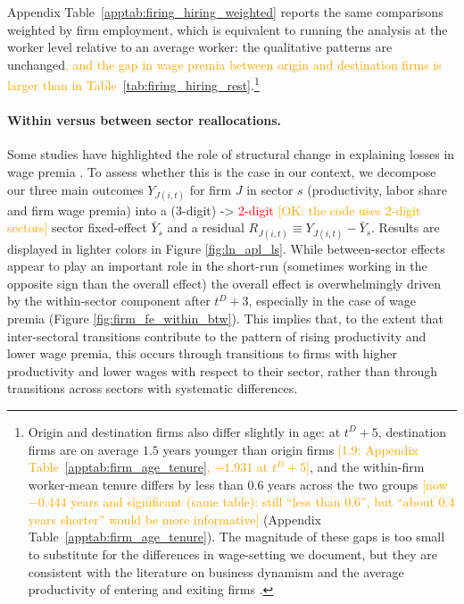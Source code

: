 Appendix Table~\ref{apptab:firing_hiring_weighted} reports the same comparisons weighted by firm employment, which is equivalent to running the analysis at the worker level relative to an average worker: the qualitative patterns are unchanged\textcolor{orange}{, and the gap in wage premia between origin and destination firms is larger than in Table~\ref{tab:firing_hiring_rest}}.\footnote{Origin and destination firms also differ slightly in age: at $t^D+5$, destination firms are on average $1.5$ years younger than origin firms \textcolor{orange}{[1.9: Appendix Table~\ref{apptab:firm_age_tenure}, $-1.931$ at $t^D+5$]}, and the within-firm worker-mean tenure differs by less than $0.6$ years across the two groups \textcolor{orange}{[now $-0.444$ years and significant (same table): still ``less than 0.6'', but ``about 0.4 years shorter'' would be more informative]} (Appendix Table~\ref{apptab:firm_age_tenure}). The magnitude of these gaps is too small to substitute for the differences in wage-setting we document, but they are consistent with the literature on business dynamism and the average productivity of entering and exiting firms \citep{foster2008reallocation,haltiwanger2018cyclical}.}




\paragraph{Within versus between sector reallocations.} Some studies have highlighted the role of structural change in explaining losses in wage premia \citep{helm2022}. To assess whether this is the case in our context, %
we decompose our three main outcomes $Y_{J(i,t)}$ for firm $J$ in sector $s$ %
(productivity, labor share and firm wage premia) into a (3-digit) -> \textcolor{red}{2-digit} \textcolor{orange}{[OK: the code uses 2-digit sectors]} sector fixed-effect $\bar{Y}_s$ and a residual $R_{J(i,t)} \equiv Y_{J(i,t)}-\bar{Y}_s$. Results are displayed in lighter colors in Figure \ref{fig:ln_apl_ls}. While between-sector effects appear to play an important role in the short-run (sometimes working in the opposite sign than the overall effect) the overall effect is overwhelmingly driven by the within-sector component after $t^D+3$, especially in the case of wage premia (Figure \ref{fig:firm_fe_within_btw}). This implies that, to the extent that inter-sectoral transitions contribute to the pattern of rising productivity and lower wage premia, this occurs through transitions to firms with higher productivity and lower wages with respect to their sector, rather than through transitions across sectors with systematic differences.





\FloatBarrier


